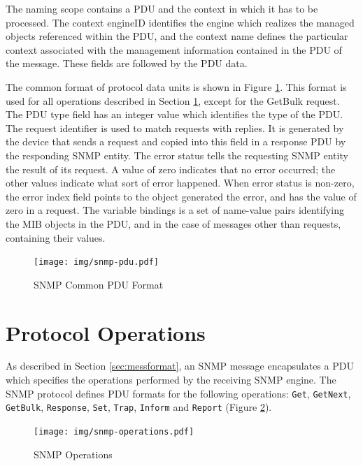 The naming scope contains a PDU and the context in which it has to be processed. The context engineID identifies the engine which realizes the managed objects referenced within the PDU, and the context name defines the particular context associated with the management information contained in the PDU of the message. These fields are followed by the PDU data.

The common format of protocol data units is shown in Figure \ref{fig:snmp-pdu}. This format is used for all operations described in Section \ref{sec:opetations}, except for the GetBulk request. The PDU type field has an integer value which identifies the type of the PDU. The request identifier is used to match requests with replies. It is generated by the device that sends a request and copied into this field in a response PDU by the responding SNMP entity. The error status tells the requesting SNMP entity the result of its request. A value of zero indicates that no error occurred; the other values indicate what sort of error happened. When error status is non-zero, the error index field points to the object generated the error, and has the value of zero in a request. The variable bindings is a set of name-value pairs identifying the MIB objects in the PDU, and in the case of messages other than requests, containing their values.
\begin{figure}[htp]	
\begin{center}
    \texttt{[image: img/snmp-pdu.pdf]}
    \caption{SNMP Common PDU Format}   
	\label{fig:snmp-pdu}
\end{center}
\end{figure}


\section{Protocol Operations}\label{sec:opetations}
As described in Section \ref{sec:messformat}, an SNMP message encapsulates a PDU which specifies the operations performed by the receiving SNMP engine. The SNMP protocol defines PDU formats for the following operations: \texttt{Get}, \texttt{GetNext}, \texttt{GetBulk}, \texttt{Response}, \texttt{Set}, \texttt{Trap}, \texttt{Inform} and \texttt{Report} (Figure \ref{fig:snmp-operations}). 

\begin{figure}[htp]	
\begin{center}
	\label{fig:snmp-operations}
    \texttt{[image: img/snmp-operations.pdf]}
    \caption{SNMP Operations}   
\end{center}
\end{figure}


